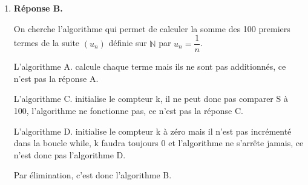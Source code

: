 \documentclass[10pt]{article}
\providecommand{\N}{\mathbb{N}}
\begin{document}
\begin{enumerate}
On cherche la probabilité $P_V(B)$.

$P(\mathrm{V} \cap B) = P(B) \times P_ B(V)=\dfrac{1}{2}\times \dfrac{3}{4}=\dfrac{3}{8}$

Les évènements $A$ et $B$ partitionnant l'univers,  la loi des probabilités totales donne :

$P(V)=P(V\cap A )+p(V \cap B) =P(A) \times P_A(V) +\dfrac{3}{8}=\dfrac{1}{2}\times \dfrac{1}{2}+\dfrac{3}{8}=\dfrac{1}{4}+\dfrac{3}{8}= \dfrac{2}{8}+\dfrac{3}{8}=\dfrac{5}{8}$

$P_V(B)=\dfrac{P(V\cap B)}{P(V)}= \dfrac{\frac{3}{8}}{\frac{5}{8}}= \dfrac{3}{5}$.
\item \textbf{Réponse B.}








On cherche l'algorithme qui permet de calculer la somme des 100 premiers termes de la suite $\left( u_n\right)$ définie sur $\N$ par $u_n=\dfrac{1}{n}$.
	
	L'algorithme A.  calcule chaque terme mais ils ne sont pas additionnés,  ce n'est pas la réponse A. 
	
	L'algorithme C.  initialise le compteur k,  il ne peut donc pas comparer S à 100,  l'algorithme ne fonctionne pas,  ce n'est pas la réponse C.

	L'algorithme D. initialise le compteur k à zéro mais il n'est pas incrémenté dans la boucle while,  k faudra toujours 0 et l'algorithme ne s'arrête jamais, ce n'est donc pas l'algorithme D. 

	Par élimination,  c'est donc l'algorithme B. 

\end{enumerate}
\bigskip
\end{document}
